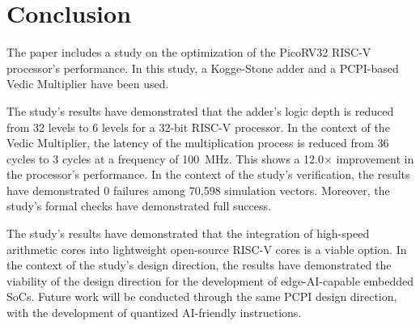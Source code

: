 \section{Conclusion}
\label{sec:conclusion}

The paper includes a study on the optimization of the PicoRV32 RISC-V processor's performance. In this study, a Kogge-Stone adder and a PCPI-based Vedic Multiplier have been used.

The study's results have demonstrated that the adder's logic depth is reduced from 32 levels to 6 levels for a 32-bit RISC-V processor. In the context of the Vedic Multiplier, the latency of the multiplication process is reduced from 36 cycles to 3 cycles at a frequency of 100~MHz. This shows a 12.0$\times$ improvement in the processor's performance. In the context of the study's verification, the results have demonstrated 0 failures among 70,598 simulation vectors. Moreover, the study's formal checks have demonstrated full success.

The study's results have demonstrated that the integration of high-speed arithmetic cores into lightweight open-source RISC-V cores is a viable option. In the context of the study's design direction, the results have demonstrated the viability of the design direction for the development of edge-AI-capable embedded SoCs. Future work will be conducted through the same PCPI design direction, with the development of quantized AI-friendly instructions.
